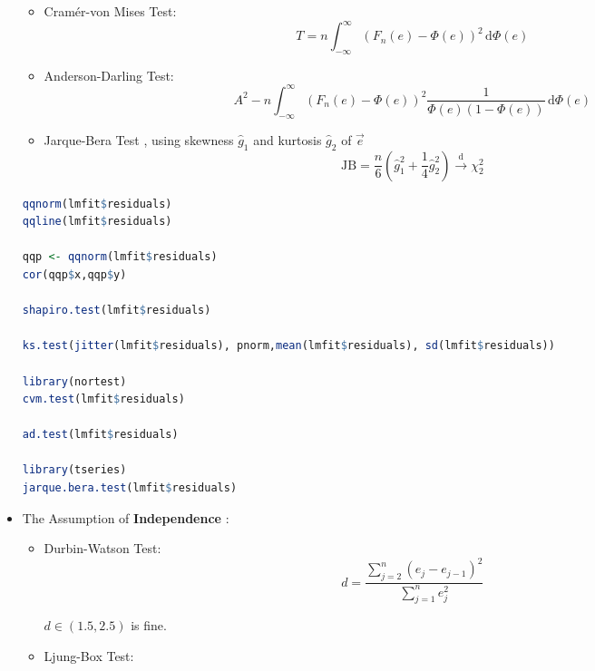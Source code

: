 \begin{itemize}[topsep=2pt,itemsep=2pt]
\begin{itemize}[topsep=2pt,itemsep=2pt]
        
        \item Cramér-von Mises Test:
        \begin{equation}
            T=n\int_{-\infty}^\infty (F_n(e)-\Phi (e)) ^2\,\mathrm{d}\Phi(e)
        \end{equation}
        \item Anderson-Darling Test:
        \begin{equation}
            A^2-n\int _{-\infty}^\infty (F_n(e)-\Phi(e))^2\dfrac{1}{\Phi(e)(1-\Phi(e))} \,\mathrm{d}\Phi(e)
        \end{equation}
        \item Jarque-Bera Test , using skewness $ \hat{g}_1 $ and kurtosis $ \hat{g}_2 $ of $ \vec{e} $
        \begin{equation}
            \mathrm{JB}=\dfrac{n}{6}(\hat{g}_1^2+\dfrac{1}{4}\hat{g}_2^2) \xrightarrow[]{\mathrm{d}} \chi^2_2
        \end{equation}
    \end{itemize}
\begin{rcode}
\begin{lstlisting}[language=R]
qqnorm(lmfit$residuals)
qqline(lmfit$residuals)

qqp <- qqnorm(lmfit$residuals)
cor(qqp$x,qqp$y)

shapiro.test(lmfit$residuals)

ks.test(jitter(lmfit$residuals), pnorm,mean(lmfit$residuals), sd(lmfit$residuals))

library(nortest)
cvm.test(lmfit$residuals)

ad.test(lmfit$residuals)

library(tseries)
jarque.bera.test(lmfit$residuals)
\end{lstlisting}

\end{rcode}


    \item The Assumption of \textbf{Independence} :
    \begin{itemize}
        \item Durbin-Watson Test:  
        \begin{equation}
            d=\dfrac{\sum_{j=2}^n(e_j-e_{j-1})^2}{\sum_{j=1}^ne_j^2} 
        \end{equation}
        
        $ d\in (1.5,2.5) $ is fine.
        \item Ljung-Box Test:
        

\end{itemize}
\end{itemize}
